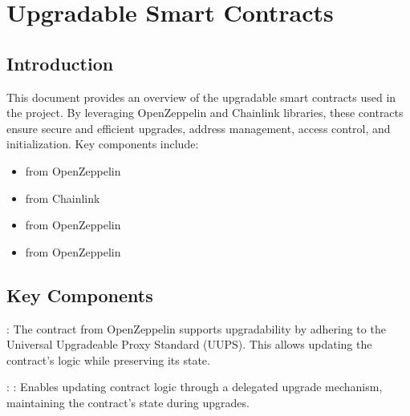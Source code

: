 \documentclass[letterpaper,10pt,english]{sphinxmanual}
\begin{document}
\sphinxstepscope


\chapter{Upgradable Smart Contracts}
\label{\detokenize{docs_upgradable_contract:upgradable-smart-contracts}}\label{\detokenize{docs_upgradable_contract::doc}}

\section{Introduction}
\label{\detokenize{docs_upgradable_contract:introduction}}
\sphinxAtStartPar
This document provides an overview of the upgradable smart contracts used in the project. By leveraging OpenZeppelin and Chainlink libraries, these contracts ensure secure and efficient upgrades, address management, access control, and initialization. Key components include:
\begin{itemize}
\item {} 
\sphinxAtStartPar
{} from OpenZeppelin

\item {} 
\sphinxAtStartPar
{} from Chainlink

\item {} 
\sphinxAtStartPar
{} from OpenZeppelin

\item {} 
\sphinxAtStartPar
{} from OpenZeppelin

\end{itemize}


\section{Key Components}
\label{\detokenize{docs_upgradable_contract:key-components}}
\sphinxAtStartPar
{}

\sphinxAtStartPar
{}:
The  contract from OpenZeppelin supports upgradability by adhering to the Universal Upgradeable Proxy Standard (UUPS). This allows updating the contract’s logic while preserving its state.

\sphinxAtStartPar
{}:
\sphinxhyphen{} : Enables updating contract logic through a delegated upgrade mechanism, maintaining the contract’s state during upgrades.
\end{document}
